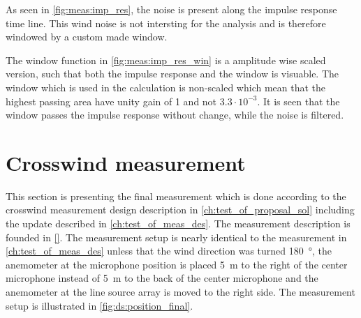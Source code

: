 

As seen in \autoref{fig:meas:imp_res}, the noise is present along the impulse response time line. This wind noise is not intersting for the analysis and is therefore windowed by a custom made window.   



The window function in \autoref{fig:meas:imp_res_win} is a amplitude wise scaled version, such that both the impulse response and the window is visuable. The window which is used in the calculation is non-scaled which mean that the highest passing area have unity gain of 1 and not $3.3 \cdot 10^{-3}$. It is seen that the window passes the impulse response without change, while the noise is filtered.





\section{Crosswind measurement}\label{mes:kudo:cross_mes}
This section is presenting the final measurement which is done according to the crosswind measurement design description in \autoref{ch:test_of_proposal_sol} including the update described in \autoref{ch:test_of_meas_des}. The measurement description is founded in \autoref{}. The measurement setup is nearly identical to the measurement in \autoref{ch:test_of_meas_des} unless that the wind direction was turned \SI{180}{\degree}, the anemometer at the microphone position is placed \SI{5}{\meter} to the right of the center microphone instead of \SI{5}{\meter} to the back of the center microphone and the anemometer at the line source array is moved to the right side. The measurement setup is illustrated in \autoref{fig:ds:position_final}.





